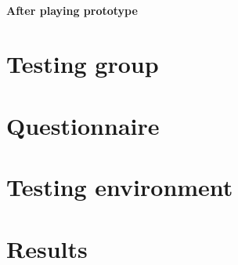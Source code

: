 \paragraph{After playing prototype}
\section{Testing group}
\section{Questionnaire}
\section{Testing environment}
\section{Results}